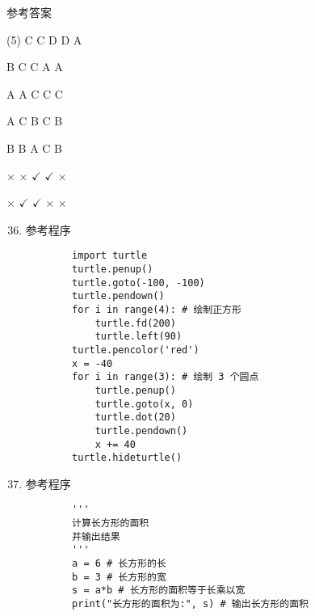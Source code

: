 \documentclass[11pt]{ctexart}
\begin{document}
\begin{center}
    \Huge \heiti 参考答案
\end{center}

    \begin{tasks}[label=\arabic*.](5)
        \task C
        \task C
        \task D
        \task D
        \task A

        \task B
        \task C
        \task C
        \task A
        \task A

        \task A
        \task A
        \task C
        \task C
        \task C

        \task A
        \task C
        \task B
        \task C
        \task B

        \task B
        \task B
        \task A
        \task C
        \task B

        \task $\times$
        \task $\times$
        \task $\checkmark$
        \task $\checkmark$
        \task $\times$

        \task $\times$
        \task $\checkmark$
        \task $\checkmark$
        \task $\times$
        \task $\times$
    \end{tasks}

\begin{enumerate}
    \setcounter{enumi}{35}
    \item 参考程序
    \begin{lstlisting}
        import turtle
        turtle.penup()
        turtle.goto(-100, -100)
        turtle.pendown()
        for i in range(4): # 绘制正方形
            turtle.fd(200)
            turtle.left(90)
        turtle.pencolor('red')
        x = -40
        for i in range(3): # 绘制 3 个圆点
            turtle.penup()
            turtle.goto(x, 0)
            turtle.dot(20)
            turtle.pendown()
            x += 40
        turtle.hideturtle()
    \end{lstlisting}

    \item 参考程序
    \begin{lstlisting}
        ''' 
        计算长方形的面积
        并输出结果
        '''
        a = 6 # 长方形的长
        b = 3 # 长方形的宽
        s = a*b # 长方形的面积等于长乘以宽
        print("长方形的面积为:", s) # 输出长方形的面积
    \end{lstlisting}
\end{enumerate}
\end{document}

